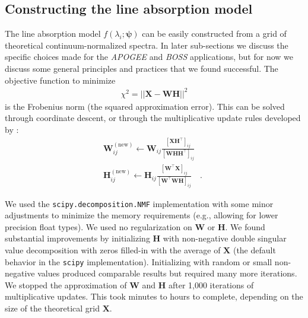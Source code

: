 \documentclass[modern]{aastex631}
\newcommand{\vecpsi}{\boldsymbol{\psi}}
\newcommand{\vecW}{\mathbf{W}}
\newcommand{\vecH}{\mathbf{H}}
\newcommand{\vecX}{\mathbf{X}}
\newcommand{\transpose}{^\top}
\begin{document}


\subsection{Constructing the line absorption model}

The line absorption model $f(\lambda_i;\vecpsi)$ can be easily constructed from a grid of theoretical continuum-normalized spectra. In later sub-sections we discuss the specific choices made for the \emph{APOGEE} and \emph{BOSS} applications, but for now we discuss some general principles and practices that we found successful. The objective function to minimize
\begin{align}
    \chi^2 = ||\vecX - \vecW\vecH||^2
\end{align}
\noindent{}is the Frobenius norm (the squared approximation error). This can be solved through coordinate descent, or through the multiplicative update rules developed by \citet{Lee:2000}:
\begin{align}
    \vecW_{ij}^{\mathrm{(new)}} \leftarrow \vecW_{ij} \frac{\left[\vecX\vecH\transpose\right]_{ij}}{\left[\vecW\vecH\vecH\transpose\right]_{ij}} \quad \phantom{.}\\
    \vecH_{ij}^{\mathrm{(new)}} \leftarrow \vecH_{ij} \frac{\left[\vecW\transpose\vecX\right]_{ij}}{\left[\vecW\transpose\vecW\vecH\right]_{ij}} \quad .
\end{align}

We used the \texttt{scipy.decomposition.NMF} implementation \citep{scipy} with some minor adjustments to minimize the memory requirements (e.g., allowing for lower precision float types). We used no regularization on $\vecW$ or $\vecH$. We found substantial improvements by initializing $\vecH$ with non-negative double singular value decomposition with zeros filled-in with the average of $\vecX$ (the default behavior in the \texttt{scipy} implementation). Initializing with random or small non-negative values produced comparable results but required many more iterations. We stopped the approximation of $\vecW$ and $\vecH$ after 1,000 iterations of multiplicative updates. This took minutes to hours to complete, depending on the size of the theoretical grid $\vecX$.\\
\end{document}
